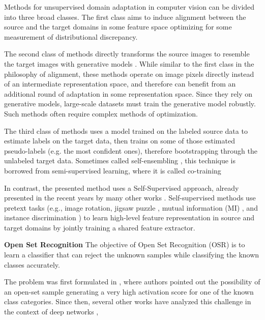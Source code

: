 \documentclass[10pt,twocolumn,letterpaper]{article}
\begin{document}
Methods for unsupervised domain adaptation in computer vision can be divided into 
three broad classes. The first class aims to induce alignment between the
source and the target domains in some feature space optimizing for some
measurement of distributional discrepancy. \cite{bousmalis2016domain,long2015learning,long2017deep,ganin2015unsupervised,hoffman2017cycada}

The second class of methods directly transforms the source images to resemble 
the target images with generative models \cite{taigman2016unsupervised,tzeng2017adversarial,bousmalis2017unsupervised}. 
While similar to the first class in the philosophy of alignment, 
these methods operate on image pixels directly instead of an intermediate 
representation space, and therefore can benefit from an additional
round of adaptation in some representation space. Since they rely on generative 
models, large-scale datasets must train the generative model robustly.
Such methods often require complex methods of optimization.

The third class of methods uses a model trained on the labeled source data to 
estimate labels on the target data, then trains on some of those estimated 
pseudo-labels (e.g. the most confident ones), therefore bootstrapping through the 
unlabeled target data. Sometimes called self-ensembling \cite{french2018selfensembling}, this technique is borrowed from semi-supervised learning, 
where it is called co-training \cite{saito2017asymmetric,zou2018domain,chen2017rethinking}

In contrast, the presented method uses a Self-Supervised approach, already presented in 
the recent years by many other works \cite{sun2019unsupervised,yue2021prototypical,saito2020universal,BAFFOUR2022126,kim2020crossdomain,ieeeopensetselfsup} . Self-supervised methods use pretext tasks 
(e.g., image rotation, jigsaw puzzle \cite{CarlucciJigsaw}, mutual information (MI) \cite{selfsupfeng}, 
and instance discrimination \cite{chen2020simple}) to learn high-level feature representation in 
source and target domains by jointly training a shared feature extractor.


\textbf{Open Set Recognition}
The objective of Open Set Recognition (OSR) is to learn a classifier that can 
reject the unknown samples while classifying the known classes accurately.

The problem was first formulated in \cite{firstPaperOSR}, where authors 
pointed out the possibility of an open-set sample generating a very high 
activation score for one of the known class categories. 
Since then, several other works have analyzed this challenge in the context 
of deep networks \cite{perera2019deep},\cite{hein2019relu}
\end{document}
